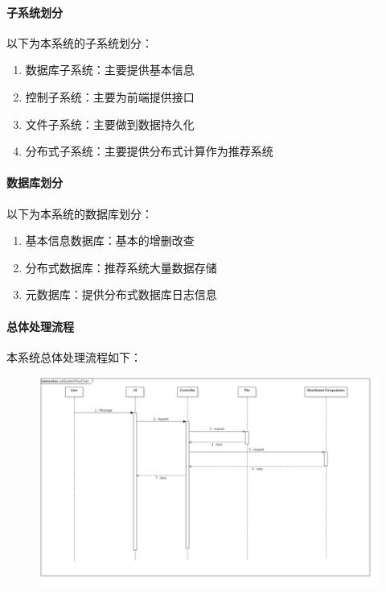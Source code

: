 \documentclass[UTF8]{ctexart}
\begin{document}
\paragraph{子系统划分}
以下为本系统的子系统划分：\\
\begin{enumerate}[1)]
\item 数据库子系统：主要提供基本信息
\item 控制子系统：主要为前端提供接口
\item 文件子系统：主要做到数据持久化
\item 分布式子系统：主要提供分布式计算作为推荐系统
\end{enumerate}

\paragraph{数据库划分}
以下为本系统的数据库划分：\\
\begin{enumerate}[1)]
\item 基本信息数据库：基本的增删改查
\item 分布式数据库：推荐系统大量数据存储
\item 元数据库：提供分布式数据库日志信息
\end{enumerate}

\paragraph{总体处理流程}
本系统总体处理流程如下：\\
\begin{figure}[H]
\centering
\includegraphics[width = 1.1\textwidth]{subSystemFlowChart.jpg}
\end{figure}
\end{document}
